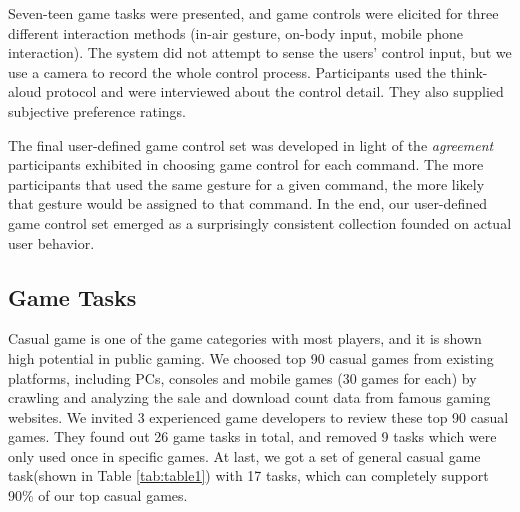 \documentclass{sigchi}
\begin{document}
    Seven-teen game tasks were presented, and game controls were elicited for three different interaction methods (in-air gesture, on-body input, mobile phone interaction). The system did not attempt to sense the users' control input, but we use a camera to record the whole control process. Participants used the think-aloud protocol and were interviewed about the control detail. They also supplied subjective preference ratings.

    The final user-defined game control set was developed in light of the \textsl{agreement} participants exhibited in choosing game control for each command\cite{Wobbrock:2005:MGS:1056808.1057043}. The more participants that used the same gesture for a given command, the more likely that gesture would be assigned to that command. In the end, our user-defined game control set emerged as a surprisingly consistent collection founded on actual user behavior.


    \subsection {Game Tasks}

    Casual game is one of the game categories with most players\cite{esa_ef_2014}, and it is shown high potential in public gaming\cite{Jurgelionis:2011:PET:2027456.2027462,Reis:2012:EMC:2405577.2405651,Biskupski:2014:DEB:2559206.2580097}. We choosed top 90 casual games\cite{TopGames} from existing platforms, including PCs, consoles and mobile games (30 games for each) by crawling and analyzing the sale and download count data from famous gaming websites\cite{appannie,VGChartz,Steam,GameStop}. We invited 3 experienced game developers to review these top 90 casual games. They found out 26 game tasks in total, and removed 9 tasks which were only used once in specific games. At last, we got a set of general casual game task(shown in Table \ref{tab:table1}) with 17 tasks, which can completely support 90\% of our top casual games. 
\end{document}
